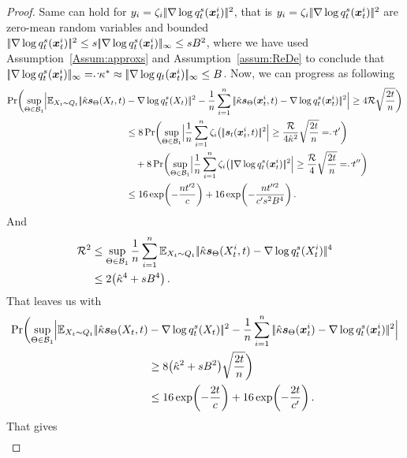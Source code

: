 \begin{proof}
 Same can hold for $y_i=\zeta_i |\!|\nabla\log q^s_t(\textcolor{black}{\boldsymbol{x}}_t^i)|\!|^2$, that is $y_i=\zeta_i |\!|\nabla\log q^s_t(\textcolor{black}{\boldsymbol{x}}_t^i)|\!|^2$ are zero-mean random variables and bounded $|\!|\nabla\log q^s_t(\textcolor{black}{\boldsymbol{x}}_t^i)|\!|^2 \le s |\!|\nabla\log q^s_t(\textcolor{black}{\boldsymbol{x}}_t^i)|\!|_{\infty} \le s  B^2$, where we have used Assumption~\ref{Assum:approxs} and Assumption~\ref{assum:ReDe} to conclude that $\norm{\nabla\log q^s_t(\x_t^i)}_{\infty} \eqd \scaleS\approx \norm{\nabla\log q_t(\x_t^i)}_{\infty} \le  \DerBound$.
 Now, we can progress as following 
 \begin{align*}
     \Pr \biggl(\sup_{\NetP\in \paramspaceone}\Bigl|\E_{X_t\sim Q_t}\norm{\scaleh\scoref(X_t,t)&-\nabla\log q^s_t(X_t)}^2
     -\frac{1}{n} \sum_{i=1}^{n}  \norm{\scaleh\scoref(\x_t^i,t)-\nabla\log q^s_t(\x_t^i)}^2\Bigr| \ge 4\Rs\sqrt{\frac{2t}{n}}\biggr)\\
     &\le 8 \Pr \biggl(\sup_{\NetP\in \paramspaceone}\Bigl|\frac{1}{n} \sum_{i=1}^{n} \zeta_i \bigl( \norm{\st(\x_t^i,t)}^2\Bigr| \ge \frac{\Rs}{4\scaleh^2}\sqrt{\frac{2t}{n}}\eqd t'\biggr)\\
     &~~~+8 \Pr \biggl(\sup_{\NetP\in \paramspaceone}\Bigl|\frac{1}{n} \sum_{i=1}^{n} \zeta_i \bigl( \norm{\nabla\log q^s_t(\x_t^i)}^2\Bigr| \ge \frac{\Rs}{4}\sqrt{\frac{2t}{n}}\eqd t''\biggr)\\
     &\le 16\exp\biggl(-\frac{n  t'^2}{c}\biggr)+16\exp\biggl(-\frac{n  t''^2}{c's^2\DerBound^4}\biggr)\,.
 \end{align*} 
And  
 \begin{align*}
\mathcal{R}^2&\le  \sup_{\textcolor{black}{\Theta}\in \textcolor{black}{\mathcal{B}_1}}\frac{1}{n}\sum_{i=1}^{n}  \textcolor{black}{\mathbb{E}}_{X_t\sim Q_t}|\!|\hat{\kappa}\textcolor{black}{\textcolor{black}{\boldsymbol{s}}_{\textcolor{black}{\Theta}}}(X_t^i,t)-\nabla\log q^s_t(X_t^i)|\!|^4\\
& \le 2\bigl(\hat{\kappa}^4+ s{B}^4\bigr)\,.
 \end{align*}
 That leaves us with 
 \begin{align*}
      \Pr \biggl(\sup_{\textcolor{black}{\Theta}\in \textcolor{black}{\mathcal{B}_1}}\Bigl|\textcolor{black}{\mathbb{E}}_{X_t\sim Q_t}|\!|\hat{\kappa}\textcolor{black}{\textcolor{black}{\boldsymbol{s}}_{\textcolor{black}{\Theta}}}(X_t,t)&-\nabla\log q^s_t(X_t)|\!|^2
     -\frac{1}{n} \sum_{i=1}^{n}  |\!|\hat{\kappa}\textcolor{black}{\textcolor{black}{\boldsymbol{s}}_{\textcolor{black}{\Theta}}}(\textcolor{black}{\boldsymbol{x}}_t^i)-\nabla\log q^s_t(\textcolor{black}{\boldsymbol{x}}_t^i)|\!|^2\Bigr| \\
     &\ge 8\bigl(\hat{\kappa}^2+s {B}^2\bigr)\sqrt{\frac{2t}{n}}\biggr)\\
     &\le 16\exp\biggl(-\frac{2t}{c}\biggr)+16\exp\biggl(-\frac{ 2t}{c'}\biggr)\,.
 \end{align*}
 That gives 
  \begin{align*}

\end{align*}
\end{proof}
